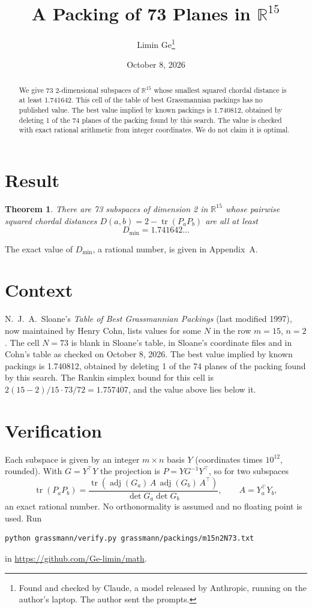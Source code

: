 \documentclass[11pt,a4paper]{article}
\title{A Packing of 73 Planes in $\mathbb{R}^{15}$}
\author{Limin Ge\thanks{Found and checked by Claude, a model released by Anthropic, running on the author's laptop. The author sent the prompts.}}
\date{October 8, 2026}
\newtheorem*{theorem}{Theorem}
\begin{document}
\maketitle
\begin{abstract}
We give 73 2-dimensional subspaces of $\mathbb{R}^{15}$ whose smallest squared chordal distance is at least 1.741642. This cell of the table of best Grassmannian packings has no published value. The best value implied by known packings is 1.740812, obtained by deleting 1 of the 74 planes of the packing found by this search. The value is checked with exact rational arithmetic from integer coordinates. We do not claim it is optimal.
\end{abstract}

\section{Result}
\begin{theorem}
There are 73 subspaces of dimension 2 in $\mathbb{R}^{15}$ whose pairwise squared chordal distances $D(a,b) = 2 - \operatorname{tr}(P_aP_b)$ are all at least
\[ D_{\min} = 1.741642\ldots \]
\end{theorem}
The exact value of $D_{\min}$, a rational number, is given in Appendix~A.


\section{Context}
N.~J.~A.~Sloane's \emph{Table of Best Grassmannian Packings} (last modified 1997), now maintained by Henry Cohn, lists values for some $N$ in the row $m=15$, $n=2$. The cell $N=73$ is blank in Sloane's table, in Sloane's coordinate files and in Cohn's table as checked on October 8, 2026. The best value implied by known packings is 1.740812, obtained by deleting 1 of the 74 planes of the packing found by this search. The Rankin simplex bound for this cell is $2(15-2)/15\cdot 73/72 = 1.757407$, and the value above lies below it.


\section{Verification}
Each subspace is given by an integer $m\times n$ basis $Y$ (coordinates times $10^{12}$, rounded). With $G=Y^\top Y$ the projection is $P=YG^{-1}Y^\top$, so for two subspaces
\[ \operatorname{tr}(P_aP_b)=\frac{\operatorname{tr}(\operatorname{adj}(G_a)\,A\,\operatorname{adj}(G_b)\,A^\top)}{\det G_a\det G_b},\qquad A=Y_a^\top Y_b, \]
an exact rational number. No orthonormality is assumed and no floating point is used. Run
\begin{verbatim}
python grassmann/verify.py grassmann/packings/m15n2N73.txt
\end{verbatim}
in \url{https://github.com/Ge-limin/math}.
\end{document}
